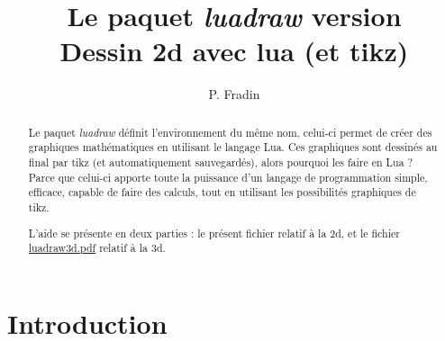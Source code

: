 \documentclass[%
10pt,%
a4paper,%
french,%
]%
{article}%
\title{\textbf{Le paquet} \emph{luadraw} version \version\\ Dessin 2d avec lua (et tikz)}
\author{P. Fradin}
\begin{document}
\maketitle


\begin{abstract}
Le paquet \emph{luadraw} définit l'environnement du même nom, celui-ci permet de créer des graphiques mathématiques en utilisant le langage Lua. Ces graphiques sont dessinés au final par tikz (et automatiquement sauvegardés), alors pourquoi les faire en Lua ? Parce que celui-ci apporte toute la puissance d'un langage de programmation simple, efficace, capable de faire des calculs, tout en utilisant les possibilités graphiques de tikz.

L'aide se présente en deux parties : le présent fichier relatif à la 2d, et le fichier \href{file://luadraw3d.pdf}{luadraw3d.pdf} relatif à la 3d.
\end{abstract}

\begin{multicols}{2}
\tableofcontents
\end{multicols}

\clearpage

\listoffigures

\clearpage

\renewcommand{\labelitemi}{$\bullet$}
\renewcommand{\labelitemii}{--}
\renewcommand{\labelitemiii}{$*$}
\renewcommand{\thesection}{\Roman{section}~}
\renewcommand{\thesubsection}{\arabic{subsection})}
\renewcommand{\thesubsubsection}{\arabic{subsection}.\arabic{subsubsection}}
\renewcommand{\thefigure}{\arabic{figure}}

\begin{center}
%
\par
{}
\end{center}

\section{Introduction}
\end{document}

